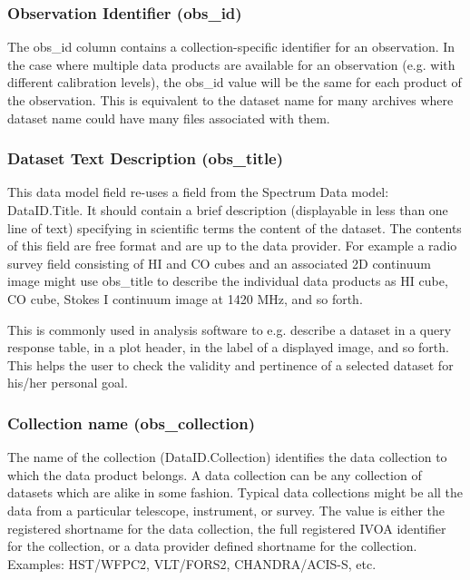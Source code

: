 \documentclass[11pt,a4paper]{ivoa}
\begin{document}
\subsubsection{Observation Identifier (obs\_id)}
The obs\_id column contains a collection-specific identifier for an observation. In the case where multiple data
products are available for an observation (e.g. with different calibration levels), the obs\_id value will be the same
for each product of the observation. This is equivalent to the dataset name for many archives where dataset name could
have many files associated with them. 

\subsubsection{Dataset Text Description (obs\_title)}
\label{bkm:Ref292046860}This data model field re-uses a field from the Spectrum Data model: DataID.Title. It should
contain a brief description (displayable in less than one line of text) specifying in scientific terms the content of
the dataset.  The contents of this field are free format and are up to the data provider.  For example a radio survey
field consisting of HI and CO cubes and an associated 2D continuum image might use obs\_title to describe the
individual data products as {\textquotedbl}HI cube{\textquotedbl}, {\textquotedbl}CO cube{\textquotedbl},
{\textquotedbl}Stokes I continuum image at 1420 MHz{\textquotedbl}, and so forth.

This is commonly used in analysis software to e.g. describe a dataset in a query response table, in a plot header, in
the label of a displayed image, and so forth. This helps the user to check the validity and pertinence of a selected
dataset for his/her personal goal. 

\subsubsection{Collection name (obs\_collection)}
The name of the collection (DataID.Collection) identifies the data collection to which the data product belongs.  A data
collection can be any collection of datasets which are alike in some fashion.  Typical data collections might be all
the data from a particular telescope, instrument, or survey. The value is either the registered shortname for the data
collection, the full registered IVOA identifier for the collection, or a data provider defined shortname for the
collection. Examples: HST/WFPC2, VLT/FORS2, CHANDRA/ACIS-S, etc.
\end{document}
